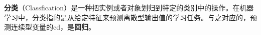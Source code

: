 
\textbf{分类}（Classfication）是一种把实例或者对象划归到特定的类别中的操作。在机器学习中，分类指的是从给定特征来预测离散型输出值的学习任务。与之对应的，预测连续型变量的cd，是\textbf{回归}。